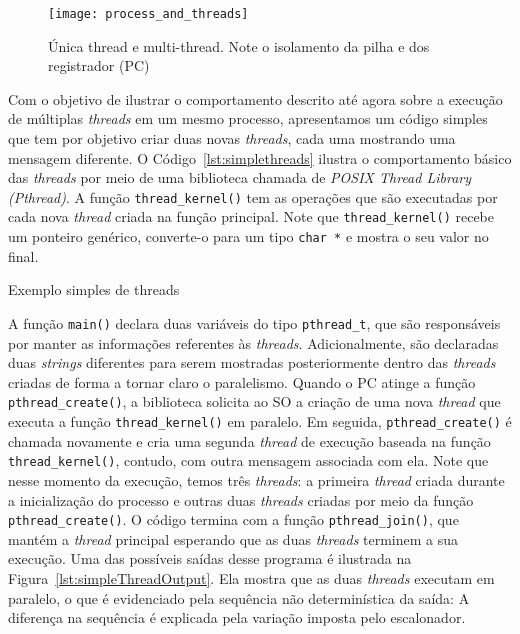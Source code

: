 \begin{figure}[!h]
  \centering
  \texttt{[image: process\_and\_threads]}
	\caption[Única thread e multi-thread.]{Única thread e multi-thread. Note o isolamento da pilha e dos registrador (PC)~\citep{silberschatz}}
  \label{fig:single_thread_multi_thread}
\end{figure}

Com o objetivo de ilustrar o comportamento descrito até agora sobre a execução
de múltiplas \emph{threads} em um mesmo processo, apresentamos um código
simples que tem por objetivo criar duas novas \emph{threads}, cada uma mostrando
uma mensagem diferente. O Código~\ref{lst:simplethreads} ilustra o
comportamento básico das \emph{threads} por meio de uma biblioteca chamada de
\emph{POSIX Thread Library (Pthread)}. A função
\texttt{thread\_kernel()} tem as operações que são executadas por cada nova
\emph{thread} criada na função principal. Note que \texttt{thread\_kernel()}
recebe um ponteiro genérico, converte-o para um tipo \texttt{char *} e
mostra o seu valor no final.

\begin{ruledcaption}{Exemplo simples de threads\label{lst:simplethreads}}

\end{ruledcaption}

A função \texttt{main()} declara duas variáveis do tipo \texttt{pthread\_t},
que são responsáveis por manter as informações referentes às \emph{threads}.
Adicionalmente, são declaradas duas \emph{strings} diferentes para serem
mostradas posteriormente dentro das \emph{threads} criadas de forma a
tornar claro o paralelismo. Quando o PC atinge a função
\texttt{pthread\_create()}, a biblioteca solicita ao SO a criação de uma nova
\emph{thread} que executa a função \texttt{thread\_kernel()} em paralelo. Em
seguida, \texttt{pthread\_create()} é chamada novamente e cria uma segunda
\emph{thread} de execução baseada na função \texttt{thread\_kernel()}, contudo,
com outra mensagem associada com ela. Note que nesse momento da execução, temos
três \emph{threads}: a primeira \emph{thread} criada durante a inicialização do
processo e outras duas \emph{threads} criadas por meio da função
\texttt{pthread\_create()}. O código termina com a função
\texttt{pthread\_join()}, que mantém a \emph{thread} principal esperando que as
duas \emph{threads} terminem a sua execução. Uma das possíveis saídas desse
programa é ilustrada na Figura~\ref{lst:simpleThreadOutput}. Ela mostra que as
duas \emph{threads} executam em paralelo, o que é evidenciado pela sequência não
determinística da saída: A diferença na sequência é explicada pela variação
imposta pelo escalonador.

